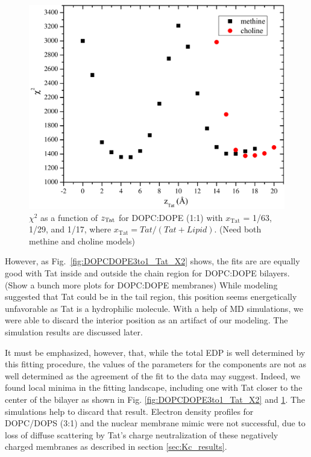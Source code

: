 \begin{figure}[htbp]
  \includegraphics[scale=0.3]{figures/Tat/SDP_Results/X2/DOPCDOPE1to1_Tat_16to1_3p0_X2}
  \caption{$\chi^2$ as a function of $z_\textrm{Tat}$ for DOPC:DOPE (1:1) with 
  $x_\textrm{Tat}$ = 1/63, 1/29, and 1/17, where $x_\textrm{Tat}=Tat/(Tat+Lipid)$.
  (Need both methine and choline models)}
  \label{fig:DOPCDOPE1to1_Tat_X2}
\end{figure}

However, as Fig.~\ref{fig:DOPCDOPE3to1_Tat_X2} shows, the fits are are 
equally good with Tat inside and outside the chain region for DOPC:DOPE bilayers.
(Show a bunch more plots for DOPC:DOPE membranes) 
While modeling suggested
that Tat could be in the tail region, this position seems energetically 
unfavorable as Tat is a hydrophilic molecule. With a help of MD simulations,
we were able to discard the interior position as an artifact of our 
modeling. The simulation results are discussed later.

It
must be emphasized, however, that, while the total EDP is well determined by 
this fitting
procedure, the values of the parameters for the components are not as well 
determined as the agreement of the fit to the data may suggest. 
Indeed, we found local
minima in the fitting landscape, including one with Tat closer to the center 
of the bilayer as
shown in Fig. \ref{fig:DOPCDOPE3to1_Tat_X2} and \ref{fig:DOPCDOPE1to1_Tat_X2}. 
The simulations help to discard that result. 
Electron density profiles for DOPC/DOPS (3:1) and the nuclear membrane 
mimic were not
successful, due to loss of diffuse scattering by Tat’s charge neutralization 
of these negatively
charged membranes as described in section \ref{sec:Kc_results}.


